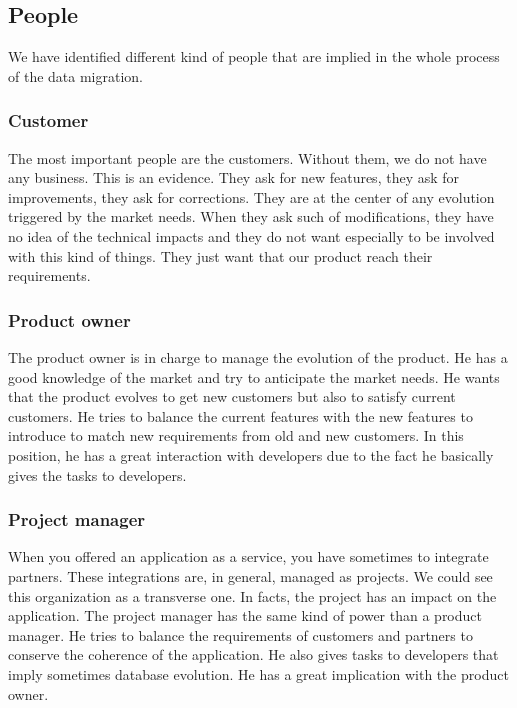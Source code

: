 \subsection{People}
	\label{sec:def:people}

We have identified different kind of people that are implied in the whole process of the data migration.

\subsubsection{Customer\\}

The most important people are the customers. Without them, we do not have any business. This is an evidence. They ask for new features, they ask for improvements, they ask for corrections. They are at the center of any evolution triggered by the market needs. When they ask such of modifications, they have no idea of the technical impacts and they do not want especially to be involved with this kind of things. They just want that our product reach their requirements.

\subsubsection{Product owner\\}

The product owner is in charge to manage the evolution of the product. He has a good knowledge of the market and try to anticipate the market needs. He wants that the product evolves to get new customers but also to satisfy current customers. He tries to balance the current features with the new features to introduce to match new requirements from old and new customers. In this position, he has a great interaction with developers due to the fact he basically gives the tasks to developers.

\subsubsection{Project manager\\}

When you offered an application as a service, you have sometimes to integrate partners. These integrations are, in general, managed as projects. We could see this organization as a transverse one. In facts, the project has an impact on the application. The project manager has the same kind of power than a product manager. He tries to balance the requirements of customers and partners to conserve the coherence of the application. He also gives tasks to developers that imply sometimes database evolution. He has a great implication with the product owner.

